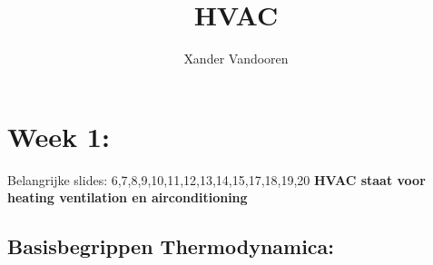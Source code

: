 \documentclass[12pt]{article}
\begin{document}
\begin{titlepage}
    \author{Xander Vandooren}
    \title{HVAC}
\end{titlepage}
\maketitle
\newpage
\tableofcontents
\newpage
{}
\section{Week 1:}
Belangrijke slides: 6,7,8,9,10,11,12,13,14,15,17,18,19,20
\textbf{HVAC staat voor heating ventilation en airconditioning}
\subsection{Basisbegrippen Thermodynamica:}
\end{document}
